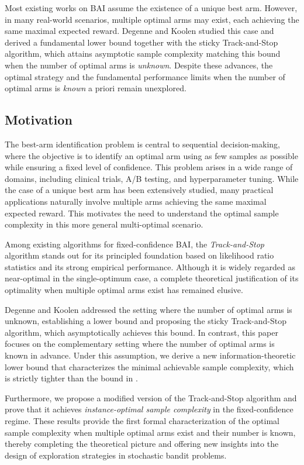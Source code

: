 \documentclass[final]{IEEEtran}
\begin{document}
Most existing works on BAI assume the existence of a unique best arm. However, in many real-world scenarios, multiple optimal arms may exist, each achieving the same maximal expected reward. Degenne and Koolen \cite{Degenne2019PureEW} studied this case and derived a fundamental lower bound together with the sticky Track-and-Stop algorithm, which attains asymptotic sample complexity matching this bound when the number of optimal arms is \emph{unknown}. Despite these advances, the optimal strategy and the fundamental performance limits when the number of optimal arms is \emph{known} a priori remain unexplored. 

\subsection{Motivation}

The best-arm identification problem is central to sequential decision-making, where the objective is to identify an optimal arm using as few samples as possible while ensuring a fixed level of confidence. This problem arises in a wide range of domains, including clinical trials, A/B testing, and hyperparameter tuning. While the case of a unique best arm has been extensively studied, many practical applications naturally involve multiple arms achieving the same maximal expected reward. This motivates the need to understand the optimal sample complexity in this more general multi-optimal scenario.

Among existing algorithms for fixed-confidence BAI, the \emph{Track-and-Stop} algorithm stands out for its principled foundation based on likelihood ratio statistics and its strong empirical performance. Although it is widely regarded as near-optimal in the single-optimum case, a complete theoretical justification of its optimality when multiple optimal arms exist has remained elusive.  

Degenne and Koolen \cite{Degenne2019PureEW} addressed the setting where the number of optimal arms is unknown, establishing a lower bound and proposing the sticky Track-and-Stop algorithm, which asymptotically achieves this bound. In contrast, this paper focuses on the complementary setting where the number of optimal arms is known in advance. Under this assumption, we derive a new information-theoretic lower bound that characterizes the minimal achievable sample complexity, which is strictly tighter than the bound in \cite{Degenne2019PureEW}.  

Furthermore, we propose a modified version of the Track-and-Stop algorithm and prove that it achieves \emph{instance-optimal sample complexity} in the fixed-confidence regime. These results provide the first formal characterization of the optimal sample complexity when multiple optimal arms exist and their number is known, thereby completing the theoretical picture and offering new insights into the design of exploration strategies in stochastic bandit problems.
\end{document}
